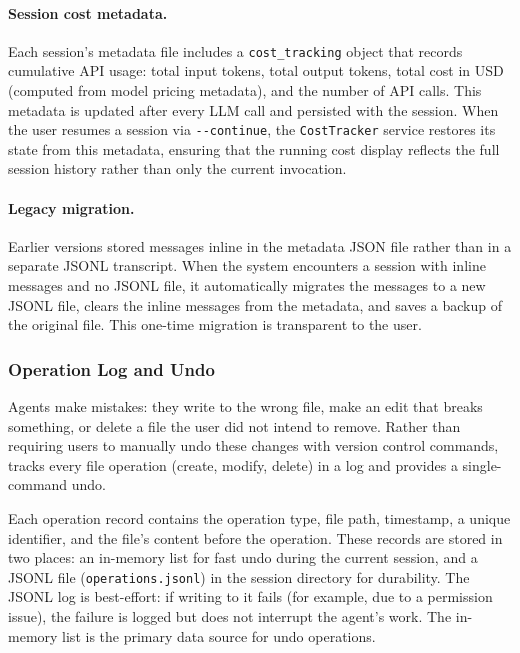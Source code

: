 \paragraph{Session cost metadata.} Each session's metadata file includes a \texttt{cost\_tracking} object that records cumulative API usage: total input tokens, total output tokens, total cost in USD (computed from model pricing metadata), and the number of API calls. This metadata is updated after every LLM call and persisted with the session. When the user resumes a session via \texttt{-{}-continue}, the \texttt{CostTracker} service restores its state from this metadata, ensuring that the running cost display reflects the full session history rather than only the current invocation.

\paragraph{Legacy migration.} Earlier versions stored messages inline in the metadata JSON file rather than in a separate JSONL transcript. When the system encounters a session with inline messages and no JSONL file, it automatically migrates the messages to a new JSONL file, clears the inline messages from the metadata, and saves a backup of the original file. This one-time migration is transparent to the user.

\subsubsection{Operation Log and Undo}
\label{sec:undo}

Agents make mistakes: they write to the wrong file, make an edit that breaks something, or delete a file the user did not intend to remove. Rather than requiring users to manually undo these changes with version control commands, \name tracks every file operation (create, modify, delete) in a log and provides a single-command undo.

Each operation record contains the operation type, file path, timestamp, a unique identifier, and the file's content before the operation. These records are stored in two places: an in-memory list for fast undo during the current session, and a JSONL file (\texttt{operations.jsonl}) in the session directory for durability. The JSONL log is best-effort: if writing to it fails (for example, due to a permission issue), the failure is logged but does not interrupt the agent's work. The in-memory list is the primary data source for undo operations.


